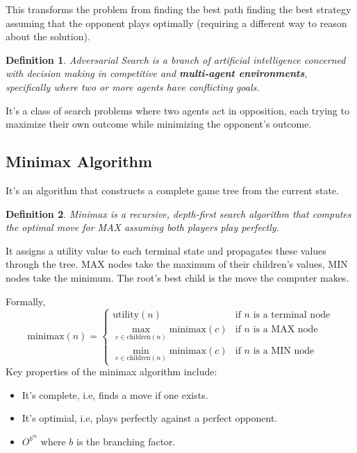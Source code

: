 \documentclass[12pt,a4paper]{report}
\newtheorem{definition}{Definition}
\begin{document}
This transforms the problem from finding the best path  finding the best strategy assuming that the opponent plays optimally (requiring a different way to reason about the solution).

\begin{definition}
    Adversarial Search is a branch of artificial intelligence concerned with decision making in competitive
    and \textbf{multi-agent environments}, specifically where two or more agents have conflicting goals.
\end{definition}

It's a class of search problems where two agents act in opposition, each trying to maximize their own
outcome while minimizing the opponent's outcome.

\subsection{Minimax Algorithm}
It's an algorithm that constructs a complete game tree from the current state.
\begin{definition}
Minimax is a recursive, depth-first search algorithm that computes the optimal move for MAX assuming
both players play perfectly.
\end{definition}
It assigns a utility value to each terminal state and propagates these values through the tree.
MAX nodes take the maximum of their children's values, MIN nodes take the minimum.
The root's best child is the move the computer makes.

Formally,
$$
\text{minimax}(n) =
\begin{cases}
\text{utility}(n) & \text{if } n \text{ is a terminal node} \\
\max\limits_{c \in \text{children}(n)} \text{minimax}(c) & \text{if } n \text{ is a MAX node} \\
\min\limits_{c \in \text{children}(n)} \text{minimax}(c) & \text{if } n \text{ is a MIN node}
\end{cases}
$$
Key properties of the minimax algorithm include:
\begin{itemize}
\item It's complete, i.e, finds a move if one exists.
\item It's optimial, i.e, plays perfectly against a perfect opponent.
\item $O^{b^{m}}$ where $b$ is the branching factor.
\end{itemize}
\end{document}
